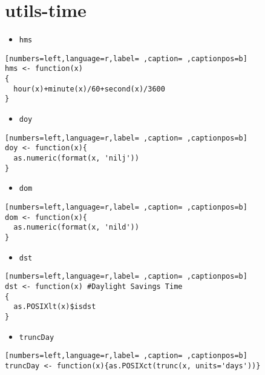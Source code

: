 \section{utils-time}
\label{sec:orgcb7bf5a}
\begin{itemize}
\item \texttt{hms}
\end{itemize}
\begin{lstlisting}[numbers=left,language=r,label= ,caption= ,captionpos=b]
hms <- function(x)
{
  hour(x)+minute(x)/60+second(x)/3600
}
\end{lstlisting}
\begin{itemize}
\item \texttt{doy}
\end{itemize}
\begin{lstlisting}[numbers=left,language=r,label= ,caption= ,captionpos=b]
doy <- function(x){
  as.numeric(format(x, 'nilj'))
}
\end{lstlisting}
\begin{itemize}
\item \texttt{dom}
\end{itemize}
\begin{lstlisting}[numbers=left,language=r,label= ,caption= ,captionpos=b]
dom <- function(x){
  as.numeric(format(x, 'nild'))
}
\end{lstlisting}
\begin{itemize}
\item \texttt{dst}
\end{itemize}
\begin{lstlisting}[numbers=left,language=r,label= ,caption= ,captionpos=b]
dst <- function(x) #Daylight Savings Time
{
  as.POSIXlt(x)$isdst
}
\end{lstlisting}
\begin{itemize}
\item \texttt{truncDay}
\end{itemize}
\begin{lstlisting}[numbers=left,language=r,label= ,caption= ,captionpos=b]
truncDay <- function(x){as.POSIXct(trunc(x, units='days'))}
\end{lstlisting}

